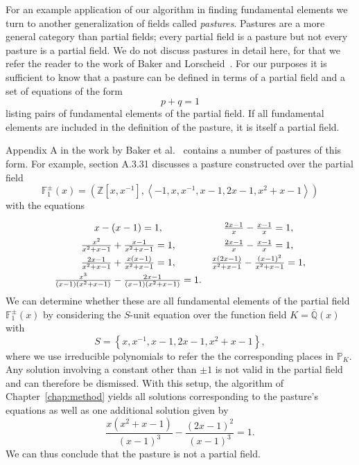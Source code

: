 For an example application of our algorithm in finding fundamental elements we turn to another generalization of fields called \textit{pastures}. Pastures are a more general category than partial fields; every partial field is a pasture but not every pasture is a partial field. We do not discuss pastures in detail here, for that we refer the reader to the work of Baker and Lorscheid~\cite{baker-2020-foundations-of-matroids}.  For our purposes it is sufficient to know that a pasture can be defined in terms of a partial field and a set of equations of the form
\[p + q = 1\]
listing pairs of fundamental elements of the partial field. If all fundamental elements are included in the definition of the pasture, it is itself a partial field.

Appendix A in the work by Baker et al.~\cite{baker-2023-foundations-of-matroids} contains a number of pastures of this form. For example, section A.3.31 discusses a pasture constructed over the partial field
\[\mathbb{F}_{1}^{\pm}(x) = \left( \mathbb{Z} \left[ x, x^{-1} \right], \left\langle -1, x, x^{-1}, x -1, 2x - 1, x^{2} + x - 1 \right\rangle \right)\]
with the equations
\begin{equation*}
  \def\arraystretch{1.5}
  \begin{array}{cc}
    x - (x - 1) = 1,                                                                  & \frac{2x - 1}{x} - \frac{x - 1}{x} = 1,                                    \\
    \frac{x^{2}}{x^{2} + x - 1} + \frac{x - 1}{x^{2} + x - 1} = 1,                    & \frac{2x - 1}{x} - \frac{x - 1}{x} = 1,                                    \\
    \frac{2x - 1}{x^{2} + x - 1} + \frac{x(x - 1)}{x^{2} + x - 1} = 1,                & \frac{x(2x - 1)}{x^{2} + x - 1} - \frac{{(x - 1)}^{2}}{x^{2} + x - 1} = 1, \\
    \frac{x^{3}}{(x - 1)(x^{2} + x - 1)} - \frac{2x - 1}{(x - 1)(x^{2} + x - 1)} = 1. &
  \end{array}
\end{equation*}
We can determine whether these are all fundamental elements of the partial field \(\mathbb{F}_{1}^{\pm}(x)\) by considering the \(S\)-unit equation over the function field \(K = \bar{\mathbb{Q}}(x)\) with
\[S = \left\{ x, x^{-1}, x -1, 2x - 1, x^{2} + x - 1 \right\},\]
where we use irreducible polynomials to refer the the corresponding places in \(\mathbb{P}_{K}\). Any solution involving a constant other than \(\pm 1\) is not valid in the partial field and can therefore be dismissed. With this setup, the algorithm of Chapter~\ref{chap:method} yields all solutions corresponding to the pasture's equations as well as one additional solution given by
\[\frac{x(x^{2} + x - 1)}{{(x - 1)}^{3}} - \frac{{(2x - 1)}^{2}}{{(x - 1)}^{3}} = 1.\]
We can thus conclude that the pasture is not a partial field.
